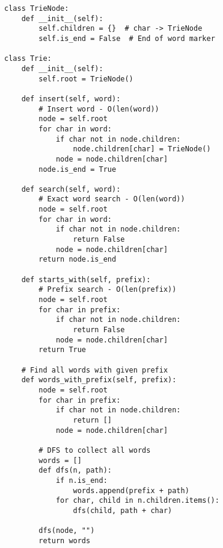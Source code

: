 \begin{lstlisting}
class TrieNode:
    def __init__(self):
        self.children = {}  # char -> TrieNode
        self.is_end = False  # End of word marker

class Trie:
    def __init__(self):
        self.root = TrieNode()
    
    def insert(self, word):
        # Insert word - O(len(word))
        node = self.root
        for char in word:
            if char not in node.children:
                node.children[char] = TrieNode()
            node = node.children[char]
        node.is_end = True
    
    def search(self, word):
        # Exact word search - O(len(word))
        node = self.root
        for char in word:
            if char not in node.children:
                return False
            node = node.children[char]
        return node.is_end
    
    def starts_with(self, prefix):
        # Prefix search - O(len(prefix))
        node = self.root
        for char in prefix:
            if char not in node.children:
                return False
            node = node.children[char]
        return True
    
    # Find all words with given prefix
    def words_with_prefix(self, prefix):
        node = self.root
        for char in prefix:
            if char not in node.children:
                return []
            node = node.children[char]
        
        # DFS to collect all words
        words = []
        def dfs(n, path):
            if n.is_end:
                words.append(prefix + path)
            for char, child in n.children.items():
                dfs(child, path + char)
        
        dfs(node, "")
        return words
\end{lstlisting}
